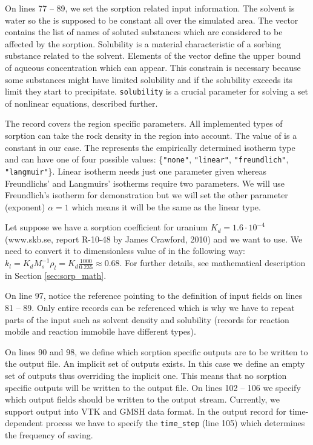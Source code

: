 On lines 77 -- 89, we set the sorption related input information. The solvent is water so the  
is supposed to be constant all over the simulated area. The vector  
contains the list of names of soluted substances which are considered to be affected by the sorption.
Solubility is a material characteristic of a sorbing substance related to the solvent. Elements of the vector 
 define the upper bound of aqueous concentration which can appear.
This constrain is necessary because some substances might have limited solubility and if the solubility exceeds 
its limit they start to precipitate. {\tt solubility} is a crucial parameter for solving a set of nonlinear 
equations, described further. 

The record  covers the region specific parameters.
All implemented types of sorption can take the rock density in the region into account. The value of 
 is a constant in our case. 
The  represents the empirically determined isotherm 
type and can have one of four possible values: \{{\tt"none"}, {\tt"linear"}, {\tt"freundlich"}, {\tt"langmuir"}\}. 
Linear isotherm needs just one parameter given whereas Freundlichs' and Langmuirs' isotherms require two parameters. 
We will use Freundlich's isotherm for demonstration but we will set the other parameter (exponent) $\alpha=1$ 
which means it will be the same as the linear type. 

Let suppose we have a sorption coefficient for uranium $K_d=1.6\cdot10^{-4}$  (www.skb.se, report R-10-48 by James Crawford, 2010) 
and we want to use. We need to convert it to dimensionless value of 
in the following way: $k_l = K_dM_s^{-1}\rho_l = K_d\frac{1000}{0.235}\approx0.68$. For further details, see 
mathematical description in Section \ref{sec:sorp_math}. 

On line 97, notice the reference pointing to the definition of input fields on lines 81 -- 89. Only entire records 
can be referenced which is why we have to repeat parts of the input such as solvent density and solubility 
(records for reaction mobile and reaction immobile have different types).

On lines 90 and 98, we define which sorption specific outputs are to be written to the output file. 
An implicit set of outputs exists. In this case we define an empty set of outputs thus overriding the implicit one. 
This means that no sorption specific outputs will be written to the output file.
On lines 102 -- 106 we specify which output fields should be written to the output stream. Currently, we support output into VTK and GMSH data format.
In the output record for time-dependent process we have to specify the {\tt time\_step} (line 105) which determines the frequency of saving.




